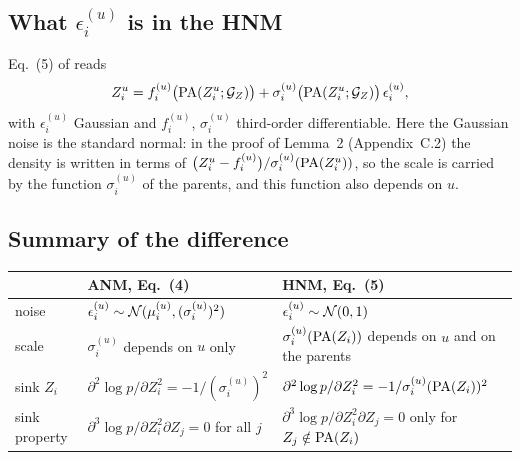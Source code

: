 \subsection{What \texorpdfstring{$\epsilon_i^{(u)}$}{epsilon} is in the HNM}
Eq.~(5) of \cite{ng2025} reads
\begin{equation}
Z_i^u=f_i^{(u)}\bigl(\mathrm{PA}(Z_i^u;\mathcal{G}_Z)\bigr)+\sigma_i^{(u)}\bigl(\mathrm{PA}(Z_i^u;\mathcal{G}_Z)\bigr)\,\epsilon_i^{(u)},
\label{eq:hnm}
\end{equation}
with $\epsilon_i^{(u)}$ Gaussian and $f_i^{(u)}$, $\sigma_i^{(u)}$ third-order differentiable. Here the Gaussian
noise is the standard normal: in the proof of Lemma~2 (Appendix~C.2) the density is written in terms of
$\bigl(Z_i^u-f_i^{(u)}\bigr)/\sigma_i^{(u)}(\mathrm{PA}(Z_i^u))$, so the scale is carried by the function
$\sigma_i^{(u)}$ of the parents, and this function also depends on $u$.

\subsection{Summary of the difference}
\begin{center}
\begin{tabular}{@{}lll@{}}
\toprule
 & ANM, Eq.~(4) & HNM, Eq.~(5)\\
\midrule
noise & $\epsilon_i^{(u)}\sim\mathcal{N}(\mu_i^{(u)},(\sigma_i^{(u)})^2)$ & $\epsilon_i^{(u)}\sim\mathcal{N}(0,1)$\\
scale & $\sigma_i^{(u)}$ depends on $u$ only & $\sigma_i^{(u)}(\mathrm{PA}(Z_i))$ depends on $u$ and on the parents\\
sink $Z_i$ & $\partial^2\log p/\partial Z_i^2=-1/(\sigma_i^{(u)})^2$ & $\partial^2\log p/\partial Z_i^2=-1/\sigma_i^{(u)}(\mathrm{PA}(Z_i))^2$\\
sink property & $\partial^3\log p/\partial Z_i^2\partial Z_j=0$ for all $j$ & $\partial^3\log p/\partial Z_i^2\partial Z_j=0$ only for $Z_j\notin\mathrm{PA}(Z_i)$\\
\bottomrule
\end{tabular}
\end{center}

